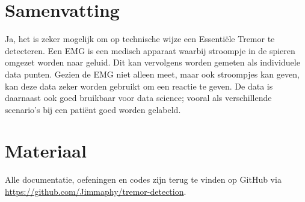 \section*{Samenvatting}

Ja, het is zeker mogelijk om op technische wijze een Essentiële Tremor te detecteren. 
Een EMG is een medisch apparaat waarbij stroompje in de spieren omgezet worden naar geluid.
Dit kan vervolgens worden gemeten als individuele data punten.
Gezien de EMG niet alleen meet, maar ook stroompjes kan geven, kan deze data zeker worden gebruikt om een reactie te geven.
De data is daarnaast ook goed bruikbaar voor data science; vooral als verschillende scenario's bij een patiënt goed worden gelabeld.

\section*{Materiaal}

Alle documentatie, oefeningen en codes zijn terug te vinden op GitHub via \url{https://github.com/Jimmaphy/tremor-detection}.